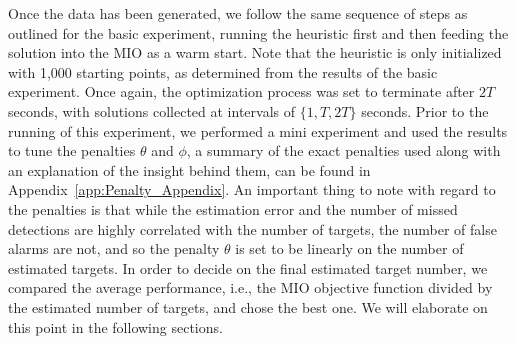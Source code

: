 Once the data has been generated, we follow the same sequence of steps as outlined for the basic experiment, running the heuristic first and then feeding the solution into the MIO as a warm start. Note that the heuristic is only initialized with 1,000 starting points, as determined from the results of the basic experiment. Once again, the optimization process was set to terminate after $2T$ seconds, with solutions collected at intervals of $\{1,T,2T\}$ seconds. Prior to the running of this experiment, we performed a mini experiment and used the results to tune the penalties $\theta$ and $\phi$, a summary of the exact penalties used along with an explanation of the insight behind them, can be found in Appendix~\ref{app:Penalty_Appendix}. An important thing to note with regard to the penalties is that while the estimation error and the number of missed detections are highly correlated with the number of targets, the number of false alarms are not, and so the penalty $\theta$ is set to be linearly on the number of estimated targets. In order to decide on the final estimated target number, we compared the average performance, i.e., the MIO objective function divided by the estimated number of targets, and chose the best one. We will elaborate on this point in the following sections.

